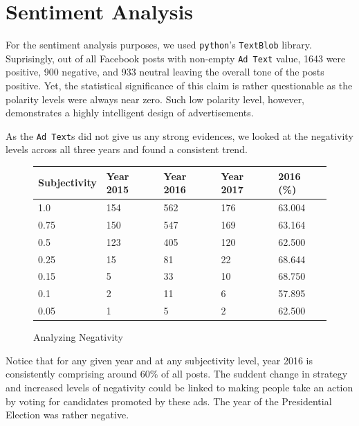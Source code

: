 \documentclass[12pt]{article}
\theoremstyle{definition}
\begin{document}

\section*{\centering Sentiment Analysis}

For the sentiment analysis purposes, we used \texttt{python}'s
\texttt{TextBlob} library. Suprisingly, out of all Facebook posts with
non-empty \texttt{Ad Text} value, 1643 were positive, 900 negative, and 933
neutral leaving the overall tone of the posts positive. Yet, the statistical
significance of this claim is rather questionable as the polarity levels were
always near zero. Such low polarity level, however, demonstrates a highly
intelligent design of advertisements.

\bigskip

As the \texttt{Ad Text}s did not give us any strong evidences, we looked at the
negativity levels across all three years and found a consistent trend.

\begin{figure}[H]
\centering
\begin{tabular}{|p{3cm}|p{3cm}|p{3cm}|p{3cm}|p{3cm}|}
 \hline
 Subjectivity & Year 2015 & Year 2016 & Year 2017 & 2016 (\%)\\
 \hline
 1.0  & 154 & 562 & 176 & 63.004\\
 \hline
 0.75 & 150 & 547 & 169 & 63.164\\
 \hline
 0.5  & 123 & 405 & 120 & 62.500\\
 \hline
 0.25 & 15  & 81  & 22  & 68.644\\
 \hline
 0.15 & 5   & 33  & 10  & 68.750\\
 \hline
 0.1  & 2   & 11  & 6   & 57.895\\
 \hline
 0.05 & 1   & 5   & 2   & 62.500\\
 \hline
\end{tabular}
\caption*{Analyzing Negativity}
\end{figure}

\bigskip

Notice that for any given year and at any subjectivity level, year 2016 is
consistently comprising around 60\% of all posts. The suddent change in
strategy and increased levels of negativity could be linked to making people
take an action by voting for candidates promoted by these ads. The year of the
Presidential Election was rather negative.
\end{document}
